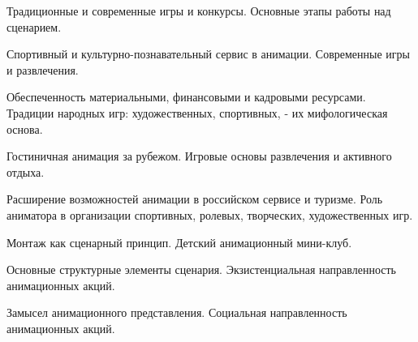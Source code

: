 \documentclass[
	14pt,
	a4paper,
	]
	{scrartcl}
\begin{document}
\vfill
\z Традиционные и современные игры и конкурсы.
 \vfill
\z Основные этапы работы над сценарием.
 \vfill

\vfill

\newpage


\shapk
{}
\setcounter{zad}{0}

\vfill
\z Спортивный и культурно-познавательный сервис в анимации.
 \vfill
\z Современные игры и развлечения. 
 \vfill

\vfill

\newpage


\shapk
{}
\setcounter{zad}{0}

\vfill
\z Обеспеченность материальными, финансовыми и кадровыми ресурсами. 
 \vfill
\z Традиции народных игр: художественных, спортивных, - их мифологическая основа. 
 \vfill

\vfill

\newpage


\shapk
{}
\setcounter{zad}{0}

\vfill
\z Гостиничная анимация за рубежом. 
 \vfill
\z Игровые основы развлечения и активного отдыха. 
 \vfill

\vfill

\newpage


\shapk
{}
\setcounter{zad}{0}

\vfill
\z Расширение возможностей анимации в российском сервисе и туризме.
 \vfill
\z Роль аниматора в организации спортивных, ролевых, творческих, художественных игр.
 \vfill

\vfill

\newpage


\shapk
{}
\setcounter{zad}{0}

\vfill
\z Монтаж как сценарный принцип. 
 \vfill
\z Детский анимационный мини-клуб. 
 \vfill

\vfill

\newpage


\shapk
{}
\setcounter{zad}{0}

\vfill
\z Основные структурные элементы сценария.
 \vfill
\z Экзистенциальная направленность анимационных акций.
 \vfill

\vfill

\newpage


\shapk
{}
\setcounter{zad}{0}

\vfill
\z Замысел анимационного представления.
 \vfill
\z Социальная направленность анимационных акций.
 \vfill
\end{document}
